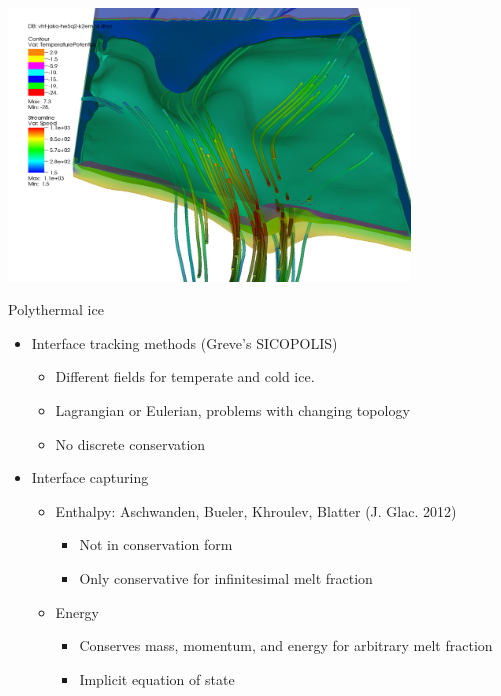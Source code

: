 \documentclass{beamer}
\begin{document}


\begin{frame}
  \includegraphics[width=0.8\textwidth]{figures/VHT/VHTJakoContourStream}
\end{frame}
\begin{frame}{Polythermal ice}
  \begin{itemize}
  \item Interface tracking methods (Greve's SICOPOLIS)
    \begin{itemize}
    \item Different fields for temperate and cold ice.
    \item Lagrangian or Eulerian, problems with changing topology
    \item No discrete conservation
    \end{itemize}
  \item Interface capturing
    \begin{itemize}
    \item Enthalpy: Aschwanden, Bueler, Khroulev, Blatter (J. Glac. 2012)
      \begin{itemize}
      \item Not in conservation form
      \item Only conservative for infinitesimal melt fraction
      \end{itemize}
    \item Energy
      \begin{itemize}
      \item Conserves mass, momentum, and energy for arbitrary melt fraction
      \item Implicit equation of state
      \end{itemize}
    \end{itemize}
  \end{itemize}
\end{frame}


%
\end{document}
